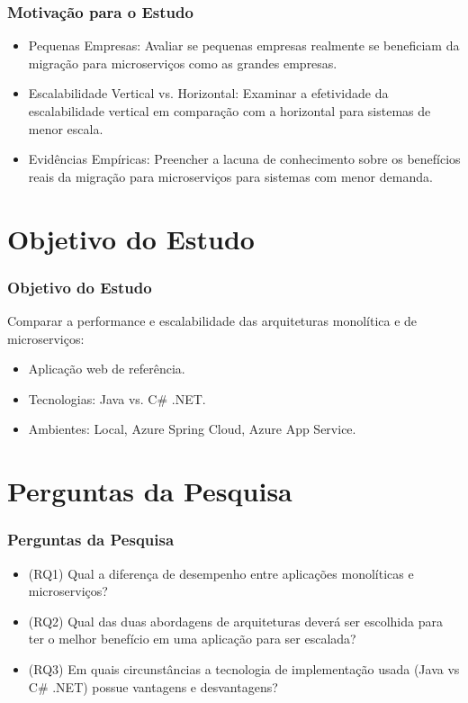 \documentclass{beamer}
\begin{document}
\begin{frame}
\frametitle{Motivação para o Estudo}
\begin{itemize}
    \item Pequenas Empresas: Avaliar se pequenas empresas realmente se beneficiam da migração para microserviços como as grandes empresas.
    \item Escalabilidade Vertical vs. Horizontal: Examinar a efetividade da escalabilidade vertical em comparação com a horizontal para sistemas de menor escala.
    \item Evidências Empíricas: Preencher a lacuna de conhecimento sobre os benefícios reais da migração para microserviços para sistemas com menor demanda.
\end{itemize}
\end{frame}

\section{Objetivo do Estudo}

\begin{frame}
\frametitle{Objetivo do Estudo}
Comparar a performance e escalabilidade das arquiteturas monolítica e de microserviços:
\begin{itemize}
    \item Aplicação web de referência.
    \item Tecnologias: Java vs. C\# .NET.
    \item Ambientes: Local, Azure Spring Cloud, Azure App Service.
\end{itemize}
\end{frame}

\section{Perguntas da Pesquisa}

\begin{frame}
\frametitle{Perguntas da Pesquisa}
\begin{itemize}
    \item (RQ1) Qual a diferença de desempenho entre aplicações monolíticas e microserviços?
    \item (RQ2) Qual das duas abordagens de arquiteturas deverá ser escolhida para ter o melhor benefício em uma aplicação para ser escalada?
    \item (RQ3) Em quais circunstâncias a tecnologia de implementação usada (Java vs C\# .NET) possue vantagens e desvantagens?
\end{itemize}
\end{frame}
\end{document}
